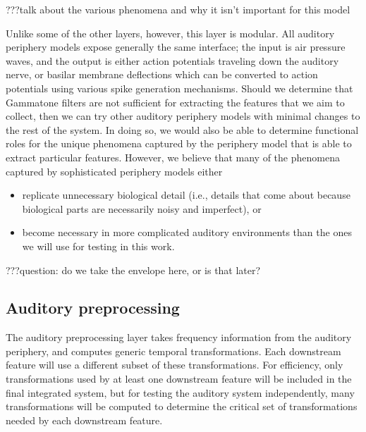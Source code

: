 ???talk about the various phenomena
and why it isn't important for this model

Unlike some of the other layers, however,
this layer is modular.
All auditory periphery models expose
generally the same interface;
the input is air pressure waves,
and the output is either action potentials
traveling down the auditory nerve,
or basilar membrane deflections
which can be converted to action potentials
using various spike generation mechanisms.
Should we determine that Gammatone filters
are not sufficient for extracting
the features that we aim to collect,
then we can try other auditory periphery models
with minimal changes to the rest of the system.
In doing so, we would also be able to
determine functional roles for the
unique phenomena captured by the
periphery model that is able to extract particular features.
However, we believe that many
of the phenomena captured
by sophisticated periphery models either
\begin{itemize}
\item replicate unnecessary biological detail
  (i.e., details that come about because biological parts
  are necessarily noisy and imperfect), or
\item become necessary in more complicated
  auditory environments than the ones
  we will use for testing in this work.
\end{itemize}

???question: do we take the envelope here,
or is that later?

\subsection{Auditory preprocessing}

The auditory preprocessing layer
takes frequency information from the auditory periphery,
and computes generic temporal transformations.
Each downstream feature will use a different
subset of these transformations.
For efficiency,
only transformations used by at least one
downstream feature will be
included in the final integrated system,
but for testing the auditory system independently,
many transformations will be computed
to determine the critical set of
transformations needed by each downstream feature.

